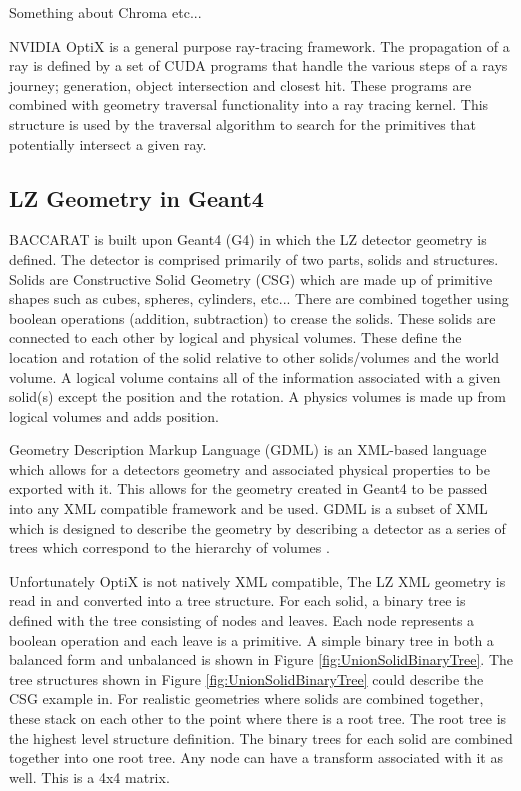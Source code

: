 \par
Something about Chroma etc...


\par
NVIDIA OptiX is a general purpose ray-tracing framework.
The propagation of a ray is defined by a set of CUDA programs that handle the various steps of a rays journey; generation, object intersection and closest hit.
These programs are combined with geometry traversal functionality into a ray tracing kernel. 
This structure is used by the traversal algorithm to search for the primitives that potentially intersect a given ray.



\subsection{LZ Geometry in Geant4}
\par
BACCARAT is built upon Geant4 (G4) in which the LZ detector geometry is defined.
The detector is comprised primarily of two parts, solids and structures.
Solids are Constructive Solid Geometry (CSG) which are made up of primitive shapes such as cubes, spheres, cylinders, etc...
There are combined together using boolean operations (addition, subtraction) to crease the solids.
These solids are connected to each other by logical and physical volumes.
These define the location and rotation of the solid relative to other solids/volumes and the world volume.
A logical volume contains all of the information associated with a given solid(s) except the position and the rotation.
A physics volumes is made up from logical volumes and adds position.

\par
Geometry Description Markup Language (GDML) is an XML-based language which allows for a detectors geometry and associated physical properties to be exported with it.
This allows for the geometry created in Geant4 to be passed into any XML compatible framework and be used.
GDML is a subset of XML which is designed to describe the geometry by describing a detector as a series of trees which correspond to the hierarchy of volumes \cite{GDML_USER_GUIDE_ref}.

\par
Unfortunately OptiX is not natively XML compatible, 
The LZ XML geometry is read in and converted into a tree structure.
For each solid, a binary tree is defined with the tree consisting of nodes and leaves.
Each node represents a boolean operation and each leave is a primitive.
A simple binary tree in both a balanced form and unbalanced is shown in Figure \ref{fig:UnionSolidBinaryTree}.
The tree structures shown in Figure \ref{fig:UnionSolidBinaryTree} could describe the CSG example in.
For realistic geometries where solids are combined together, these stack on each other to the point where there is a root tree.
The root tree is the highest level structure definition.
The binary trees for each solid are combined together into one root tree.
Any node can have a transform associated with it as well.
This is a 4x4 matrix.


